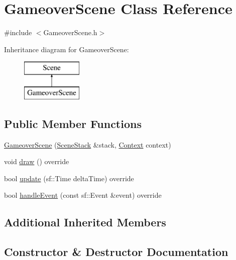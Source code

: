 \hypertarget{class_gameover_scene}{}\section{Gameover\+Scene Class Reference}
\label{class_gameover_scene}


{\ttfamily \#include $<$Gameover\+Scene.\+h$>$}

Inheritance diagram for Gameover\+Scene\+:\begin{figure}[H]
\begin{center}
\leavevmode
\includegraphics[height=2.000000cm]{class_gameover_scene}
\end{center}
\end{figure}
\subsection*{Public Member Functions}
\begin{DoxyCompactItemize}
\item 
\hyperlink{class_gameover_scene_a8d57771f3b59da589d2341d4d3b9d299}{Gameover\+Scene} (\hyperlink{class_scene_stack}{Scene\+Stack} \&stack, \hyperlink{struct_scene_1_1_context}{Context} context)
\item 
void \hyperlink{class_gameover_scene_ae8a5e79e002d0e79edaec9ec1b0df902}{draw} () override
\item 
bool \hyperlink{class_gameover_scene_a6b7f650af840f54c78b4fb1cdf2010df}{update} (sf\+::\+Time delta\+Time) override
\item 
bool \hyperlink{class_gameover_scene_ac951bc51d29e2d14807e3da2e885ccc8}{handle\+Event} (const sf\+::\+Event \&event) override
\end{DoxyCompactItemize}
\subsection*{Additional Inherited Members}


\subsection{Constructor \& Destructor Documentation}
\mbox{\label{class_gameover_scene_a8d57771f3b59da589d2341d4d3b9d299}} 
